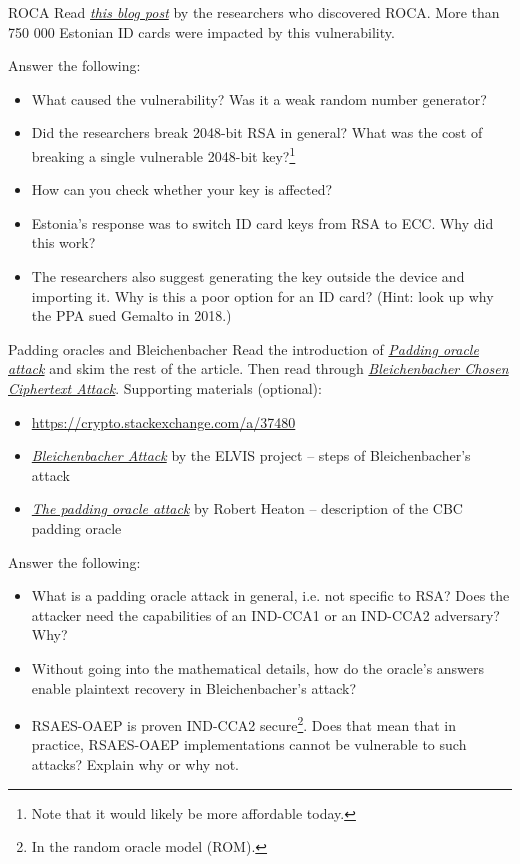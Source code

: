 \documentclass{homework}
\begin{document}
\begin{task}{ROCA}
  Read \href{https://crocs.fi.muni.cz/public/papers/rsa_ccs17}{\emph{this blog post}} by the researchers who discovered ROCA.
  More than 750 000 Estonian ID cards were impacted by this vulnerability.

  Answer the following:
  \begin{itemize}
    \item What caused the vulnerability?
    Was it a weak random number generator?
    \item Did the researchers break 2048-bit RSA in general?
    What was the cost of breaking a single vulnerable 2048-bit key?\footnote{Note that it would likely be more affordable today.}
    \item How can you check whether your key is affected?
    \item Estonia's response was to switch ID card keys from RSA to ECC.
    Why did this work?
    \item The researchers also suggest generating the key outside the device and importing it.
    Why is this a poor option for an ID card?
    (Hint: look up why the PPA sued Gemalto in 2018.)
  \end{itemize}
\end{task}

\begin{task}{Padding oracles and Bleichenbacher}
  Read the introduction of \href{https://en.wikipedia.org/wiki/Padding_oracle_attack}{\textit{Padding oracle attack}} and skim the rest of the article.
  Then read through \href{https://www.shysecurity.com/post/20160622-Bleichenbacher%20Attack}{\textit{Bleichenbacher Chosen Ciphertext Attack}}.
  Supporting materials (optional):
  \begin{itemize}
    \item \url{https://crypto.stackexchange.com/a/37480}
    \item \href{https://wiki.elvis.science/index.php?title=Bleichenbacher_Attack#Steps_of_the_Attack}{\textit{Bleichenbacher Attack}} by the ELVIS project -- steps of Bleichenbacher's attack
    \item \href{https://robertheaton.com/2013/07/29/padding-oracle-attack/}{\textit{The padding oracle attack}} by Robert Heaton -- description of the CBC padding oracle
  \end{itemize}

  Answer the following:
  \begin{itemize}
    \item What is a padding oracle attack in general, i.e. not specific to RSA?
    Does the attacker need the capabilities of an IND-CCA1 or an IND-CCA2 adversary?
    Why?
    \item Without going into the mathematical details, how do the oracle's answers enable plaintext recovery in Bleichenbacher's attack?
    \item RSAES-OAEP is proven IND-CCA2 secure\footnote{In the random oracle model (ROM).}.
    Does that mean that in practice, RSAES-OAEP implementations cannot be vulnerable to such attacks?
    Explain why or why not.
  \end{itemize}
\end{task}
\end{document}

